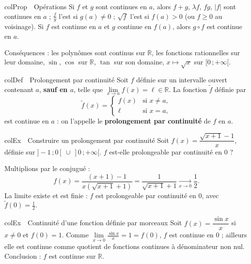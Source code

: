 \documentclass[11pt,a4paper]{article}
\newenvironment{definition}[1][Définition]
  {\begin{fiche}{colDef}{\ding{110}~~#1}}{\end{fiche}}
\newenvironment{propriete}[1][Propriété]
  {\begin{fiche}{colProp}{\ding{72}~~#1}}{\end{fiche}}
\newenvironment{exemple}[1][Exemple]
  {\begin{fiche}{colEx}{\ding{217}~~#1}}{\end{fiche}}
\begin{document}
\begin{propriete}[Opérations]
Si $f$ et $g$ sont continues en $a$, alors $f + g$, $\lambda f$, $fg$, $|f|$ sont continues en $a$ ; $\frac{f}{g}$ l'est si $g(a) \neq 0$ ; $\sqrt{f}$ l'est si $f(a) > 0$ (ou $f \geq 0$ au voisinage). Si $f$ est continue en $a$ et $g$ continue en $f(a)$, alors $g \circ f$ est continue en $a$.

\smallskip
Conséquences : les polynômes sont continus sur $\mathbb{R}$, les fonctions rationnelles sur leur domaine, $\sin$, $\cos$ sur $\mathbb{R}$, $\tan$ sur son domaine, $x \mapsto \sqrt{x}$ sur $[0\,;+\infty[$.
\end{propriete}

\begin{definition}[Prolongement par continuité]
Soit $f$ définie sur un intervalle ouvert contenant $a$, \textbf{sauf en $a$}, telle que $\lim\limits_{x \to a} f(x) = \ell \in \mathbb{R}$. La fonction $\tilde{f}$ définie par
\[
  \tilde{f}(x) =
  \begin{cases}
    f(x) & \text{si } x \neq a,\\[1mm]
    \ell & \text{si } x = a,
  \end{cases}
\]
est continue en $a$ : on l'appelle le \textbf{prolongement par continuité} de $f$ en $a$.
\end{definition}

\begin{exemple}[Construire un prolongement par continuité]
Soit $f(x) = \dfrac{\sqrt{x + 1} - 1}{x}$, définie sur $]-1\,;0[\ \cup\ ]0\,;+\infty[$. $f$ est-elle prolongeable par continuité en $0$ ?

\smallskip
Multiplions par le conjugué :
\[
  f(x) = \frac{(x + 1) - 1}{x\left(\sqrt{x+1} + 1\right)} = \frac{1}{\sqrt{x + 1} + 1}
  \xrightarrow[x \to 0]{} \frac{1}{2}.
\]
La limite existe et est finie : $f$ est prolongeable par continuité en $0$, avec $\tilde{f}(0) = \frac{1}{2}$.
\end{exemple}

\begin{exemple}[Continuité d'une fonction définie par morceaux]
Soit $f(x) = \dfrac{\sin x}{x}$ si $x \neq 0$ et $f(0) = 1$. Comme $\lim\limits_{x \to 0} \frac{\sin x}{x} = 1 = f(0)$, $f$ est continue en $0$ ; ailleurs elle est continue comme quotient de fonctions continues à dénominateur non nul. Conclusion : $f$ est continue sur $\mathbb{R}$.
\end{exemple}
\end{document}
